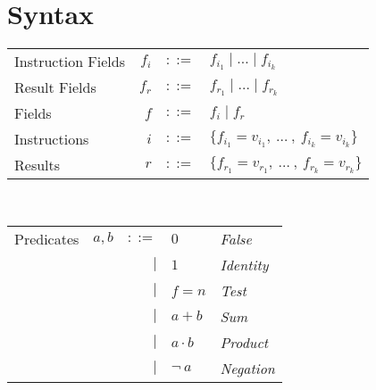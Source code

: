 \documentclass[12pt, letterpaper]{article}
\begin{document}
\section{Syntax}

    \begin{tabular}{l r c l}
        Instruction Fields   & $f_{i}$   & $::=$     & $f_{i_{1}} \mid \dots \mid f_{i_{k}}$\\
        Result Fields   & $f_{r}$   & $::=$     & $f_{r_{1}} \mid \dots \mid f_{r_{k}}$\\
        Fields          & $f$       & $::=$     & $f_i \mid f_r$ \\
        Instructions         & $i$       & $::=$     & $\{f_{i_{1}} = v_{i_{1}} ,\ \dots\ ,\ f_{i_{k}} = v_{i_{k}}\}$\\
        Results         & $r$       & $::=$     & $\{f_{r_{1}} = v_{r_{1}} ,\ \dots\ ,\ f_{r_{k}} = v_{r_{k}}\}$\\
    \end{tabular}\\

    \begin{tabular}{l c r l l}
        Predicates  & $a,b$     & $::=$  & $0$          & \textit{False} \\
                    &           & $\mid$ & $1$          & \textit{Identity}    \\
                    &           & $\mid$ & $f=n$        & \textit{Test} \\  
                    &           & $\mid$ & $a + b$      & \textit{Sum}      \\
                    &           & $\mid$ & $a \cdot b$  & \textit{Product}  \\
                    &           & $\mid$ & $\neg \ a$   & \textit{Negation}
    \end{tabular}\\
\end{document}
